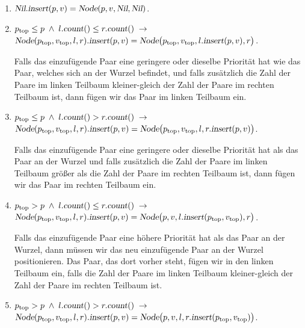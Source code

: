 \begin{enumerate}
\item $\textsl{Nil}.\textsl{insert}(p,v) = \textsl{Node}(p,v,\textsl{Nil}, \textsl{Nil})$.
\item $p_{\mathrm{top}} \leq p \;\wedge\; l.\textsl{count}() \leq r.\textsl{count}() \;\rightarrow $   \\[0.1cm]
      \hspace*{1.3cm} 
      $\textsl{Node}(p_{\mathrm{top}},v_\mathrm{top},l,r).\textsl{insert}(p,v) =
                 \textsl{Node}\bigl(p_\mathrm{top},v_\mathrm{top},l.\textsl{insert}(p,v), r\bigr)$.

      Falls das einzuf\"ugende Paar eine geringere oder dieselbe Priorit\"at hat wie das
      Paar, welches sich an der Wurzel befindet, und falls zus\"atzlich die Zahl der Paare im linken Teilbaum
      kleiner-gleich der Zahl der Paare im rechten Teilbaum ist, dann f\"ugen wir das
      Paar im linken Teilbaum ein.
\item $p_{\mathrm{top}} \leq p \;\wedge\; l.\textsl{count}() > r.\textsl{count}() \;\rightarrow $   \\[0.1cm]
      \hspace*{1.3cm} 
      $\textsl{Node}(p_{\mathrm{top}},v_\mathrm{top},l,r).\textsl{insert}(p,v) =
                 \textsl{Node}\bigl(p_\mathrm{top},v_\mathrm{top},l,r.\textsl{insert}(p,v)\bigr)$.

      Falls das einzuf\"ugende Paar eine geringere oder dieselbe Priorit\"at hat als das
      Paar an der Wurzel und falls zus\"atzlich die Zahl der Paare im linken Teilbaum
      gr\"o{\ss}er als die Zahl der Paare im rechten Teilbaum ist, dann f\"ugen wir das
      Paar im rechten Teilbaum ein.
\item $p_{\mathrm{top}} > p \;\wedge\; l.\textsl{count}() \leq r.\textsl{count}() \;\rightarrow $ \\[0.1cm]
      \hspace*{1.3cm} 
      $\textsl{Node}(p_{\mathrm{top}},v_\mathrm{top},l,r).\textsl{insert}(p,v) =
                 \textsl{Node}\bigl(p,v,l.\textsl{insert}(p_\mathrm{top},v_\mathrm{top}), r\bigr)$.

      Falls das einzuf\"ugende Paar eine h\"ohere Priorit\"at hat als das Paar an
      der Wurzel, dann m\"ussen wir das neu einzuf\"ugende Paar an der Wurzel
      positionieren.  Das Paar, das dort vorher steht, f\"ugen wir in den linken
      Teilbaum ein, falls  die Zahl der Paare im linken Teilbaum
      kleiner-gleich der Zahl der Paare im rechten Teilbaum ist.
\item $p_{\mathrm{top}} > p \;\wedge\; l.\textsl{count}() > r.\textsl{count}() \;\rightarrow $ \\[0.1cm] 
      \hspace*{1.3cm} 
      $\textsl{Node}(p_{\mathrm{top}},v_\mathrm{top},l,r).\textsl{insert}(p,v) =
                 \textsl{Node}\bigl(p,v,l,r.\textsl{insert}(p_\mathrm{top},v_\mathrm{top})\bigr)$.


\end{enumerate}
